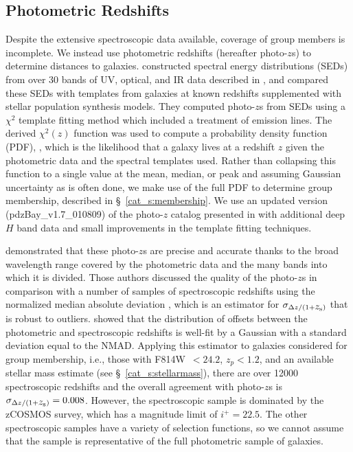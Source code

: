 \subsection{Photometric Redshifts}
\label{cat_s:photoz}

Despite the extensive spectroscopic data available, coverage of group
members is incomplete. We instead use photometric redshifts (hereafter
photo-$z$s) to determine distances to galaxies. \citet{Ilbert2009} constructed spectral energy
distributions (SEDs) from over 30 bands of UV, optical,
and IR data described in \citet{Capak2007b}, and compared these SEDs
with templates from galaxies at known redshifts supplemented with
stellar population synthesis models. They computed photo-$z$s
from SEDs using a $\chi^2$ template fitting method which included a
treatment of emission lines. The derived $\chi^2(z)$ function was used
to compute a probability density function (PDF), \pz, which is the
likelihood that a galaxy lives at a redshift $z$ given the photometric
data and the spectral templates used. Rather than collapsing this
function to a single value at the mean, median, or peak and assuming
Gaussian uncertainty as is often done, we make use of the full PDF to
determine group membership, described in \S~\ref{cat_s:membership}. 
We use an updated version (pdzBay\_v1.7\_010809) of the
photo-$z$ catalog presented in \citet{Ilbert2009} with additional deep
$H$ band data and small improvements in the template fitting
techniques.

\citet{Ilbert2009} demonstrated that these photo-$z$s are precise and
accurate thanks to the broad wavelength range covered by the
photometric data and the many bands into which it is divided.
Those authors discussed the quality of the photo-$z$s in comparison with
a number of samples of spectroscopic redshifts using the
normalized median absolute deviation \citep[NMAD $=1.48 \times$
median$(|\zs-\zp|/(1+\zs))$; ][]{Hoaglin1983}, which is an estimator for
$\sigma_{\Delta z/(1+\mbox{$z_{\rm s}$})}$ that is robust to
outliers. \citet{Ilbert2009} showed that the distribution of offsets
between the photometric and spectroscopic redshifts is well-fit by a
Gaussian with a standard deviation equal to the NMAD. Applying this
estimator to galaxies considered for group membership, i.e., those
with F814W~$<24.2$, $z_{p}<1.2$, and an available stellar mass estimate (see
\S~\ref{cat_s:stellarmass}), there are over 12000 spectroscopic redshifts
and the overall agreement with photo-$z$s is $\sigma_{\Delta z/(1+\mbox{$z_{\rm s}$})} =
0.008$. However, the spectroscopic sample is dominated by the
zCOSMOS survey, which has a magnitude limit of
$i^+=22.5$. The other spectroscopic samples have a variety of
selection functions, so we cannot assume that the sample is
representative of the full photometric sample of galaxies.

